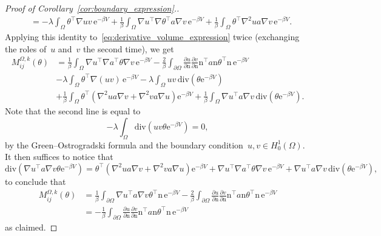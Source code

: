 \documentclass[a4]{article}
\newcommand{\e}{\mathrm{e}}
\renewcommand{\div}{\mathrm{div}}
\newcommand{\n}{\mathrm{n}}
\newcommand{\1}{\mathbbm 1}
\begin{document}
\begin{proof}[Proof of Corollary~\ref{cor:boundary_expression}.]
\begin{equation}
\begin{aligned}
        &= -\lambda\int_\Omega \theta^\top \nabla u v\,\e^{-\beta V} + \frac1\beta\int_\Omega \nabla u^\top \nabla\theta^\top a \nabla v\,\e^{-\beta V}+\frac1\beta \int_\Omega \theta^\top \nabla^2 u a \nabla v\,\e^{-\beta V}.
        \end{aligned}
    \end{equation}
    Applying this identity to~\eqref{eq:derivative_volume_expression} twice (exchanging the roles of~$u$ and~$v$ the second time), we get
    \begin{equation}
        \begin{aligned}
            M_{ij}^{\Omega,k}(\theta) &= \frac1\beta\int_\Omega \nabla u^\top \nabla a^\top \theta\nabla v\,\e^{-\beta V}-\frac2\beta\int_{\partial\Omega}\frac{\partial u}{\partial \n}\frac{\partial v}{\partial\n}\n^\top a\n \theta^\top\n\,\e^{-\beta V}\\
            &-\lambda\int_{\Omega}\theta^\top \nabla(uv)\,\e^{-\beta V}-\lambda\int_{\Omega}uv\,\div\left(\theta\e^{-\beta V}\right)\\
            &+\frac1\beta\int_\Omega\theta^\top\left(\nabla^2 u a\nabla v + \nabla^2 v a \nabla u\right)\e^{-\beta V} + \frac1\beta\int_\Omega \nabla u^\top a \nabla v\,\div\left(\theta\e^{-\beta V}\right).
        \end{aligned}
    \end{equation}
    Note that the second line is equal to
    \[-\lambda\int_\Omega \div\left(uv \theta \e^{-\beta V}\right) = 0,\]
    by the Green--Ostrogradski formula and the boundary condition~$u,v\in H_0^1(\Omega)$.
    It then suffices to notice that
    \begin{equation}
        \div\left(\nabla u^\top a \nabla v \theta \e^{-\beta V}\right) = \theta^\top\left(\nabla^2 u a\nabla v + \nabla^2 v a \nabla u\right)\e^{-\beta V} + \nabla u^\top \nabla a^\top \theta \nabla v\,\e^{-\beta V} + \nabla u^\top a \nabla v\,\div\left(\theta\e^{-\beta V}\right),
    \end{equation}
    to conclude that
    \begin{equation}
        \begin{aligned}
            M_{ij}^{\Omega,k}(\theta) &= \frac1\beta \int_{\partial\Omega}\nabla u^\top a \nabla v \theta^\top \n\,\e^{-\beta V} - \frac2\beta \int_{\partial\Omega}\frac{\partial u}{\partial \n}\frac{\partial v}{\partial\n}\n^\top a\n \theta^\top\n\,\e^{-\beta V}\\
            &=-\frac1\beta\int_{\partial\Omega}\frac{\partial u}{\partial \n}\frac{\partial v}{\partial\n}\n^\top a\n \theta^\top\n\,\e^{-\beta V}
        \end{aligned}
    \end{equation}
    as claimed.
\end{proof}
\end{document}
